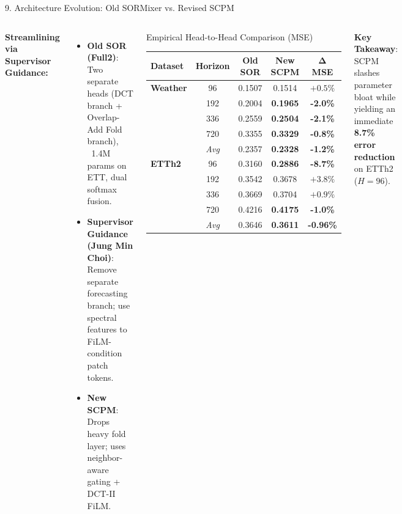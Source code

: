 \documentclass[aspectratio=169, 10pt]{beamer}
\begin{document}
\begin{frame}{9. Architecture Evolution: Old SORMixer vs. Revised SCPM}
\begin{columns}[T]
\textbf{Streamlining via Supervisor Guidance:}
\begin{itemize}
    \item \textbf{Old SOR (Full2)}: Two separate heads (DCT branch + Overlap-Add Fold branch), ~1.4M params on ETT, dual softmax fusion.
    \item \textbf{Supervisor Guidance (Jung Min Choi)}: Remove separate forecasting branch; use spectral features to FiLM-condition patch tokens.
    \item \textbf{New SCPM}: Drops heavy fold layer; uses neighbor-aware gating + DCT-II FiLM.
\end{itemize}

\begin{block}{Empirical Head-to-Head Comparison (MSE)}
\centering
\scriptsize
\setlength{\tabcolsep}{4pt}
\begin{tabular}{lcccc}
\toprule
\textbf{Dataset} & \textbf{Horizon} & \textbf{Old SOR} & \textbf{New SCPM} & $\mathbf{\Delta}$ \textbf{MSE} \\
\midrule
\textbf{Weather} & 96  & 0.1507 & 0.1514 & $+0.5\%$ \\
                 & 192 & 0.2004 & \textbf{0.1965} & \textbf{-2.0\%} \\
                 & 336 & 0.2559 & \textbf{0.2504} & \textbf{-2.1\%} \\
                 & 720 & 0.3355 & \textbf{0.3329} & \textbf{-0.8\%} \\
                 & \textit{Avg} & 0.2357 & \textbf{0.2328} & \textbf{-1.2\%} \\
\midrule
\textbf{ETTh2}   & 96  & 0.3160 & \textbf{0.2886} & \textbf{-8.7\%} \\
                 & 192 & 0.3542 & 0.3678 & $+3.8\%$ \\
                 & 336 & 0.3669 & 0.3704 & $+0.9\%$ \\
                 & 720 & 0.4216 & \textbf{0.4175} & \textbf{-1.0\%} \\
                 & \textit{Avg} & 0.3646 & \textbf{0.3611} & \textbf{-0.96\%} \\
\bottomrule
\end{tabular}
\end{block}
\vspace{-0.2cm}
\footnotesize
\textbf{Key Takeaway}: SCPM slashes parameter bloat while yielding an immediate \textbf{8.7\% error reduction} on ETTh2 ($H=96$).
\end{columns}
\end{frame}
\end{document}
